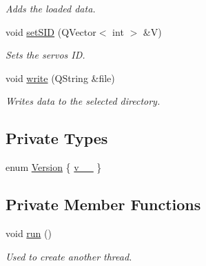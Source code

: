 \begin{DoxyCompactItemize}
\begin{DoxyCompactList}\small\item\em Adds the loaded data. \end{DoxyCompactList}\item 
void \hyperlink{class_servo_thread_ac3471e5020f5d9babd3f2ff7b3b82aca}{set\+S\+I\+D} (Q\+Vector$<$ int $>$ \&V)
\begin{DoxyCompactList}\small\item\em Sets the servos I\+D. \end{DoxyCompactList}\item 
void \hyperlink{class_servo_thread_ae5753b8c12768d2115ff900f0ab8e13c}{write} (Q\+String \&file)
\begin{DoxyCompactList}\small\item\em Writes data to the selected directory. \end{DoxyCompactList}\end{DoxyCompactItemize}
\subsection*{Private Types}
\begin{DoxyCompactItemize}
\item 
enum \hyperlink{class_servo_thread_aeccce0ac6a969e2ee7cbe91687e2d085}{Version} \{ \hyperlink{class_servo_thread_aeccce0ac6a969e2ee7cbe91687e2d085a319b6bf2cb120faeefbd0a5118ece7e3}{v\+\_\+\_}
 \}
\end{DoxyCompactItemize}
\subsection*{Private Member Functions}
\begin{DoxyCompactItemize}
\item 
void \hyperlink{class_servo_thread_aeeb31b85abf7eb5c701853a6d25e51e0}{run} ()
\begin{DoxyCompactList}\small\item\em Used to create another thread. \end{DoxyCompactList}\end{DoxyCompactItemize}
